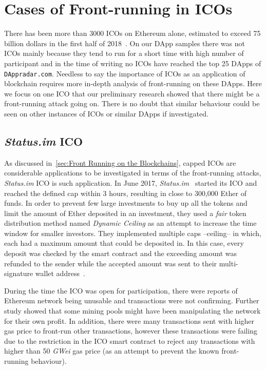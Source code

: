 \section{Cases of Front-running in ICOs}  \label{sec:ICOsfrontrunning}

There has been more than 3000 ICOs on Ethereum alone, estimated to exceed 75 billion dollars in the first half of 2018~\cite{zetzsche2018ico}. On our DApp samples there was not ICOs mainly because they tend to run for a short time with high number of participant and in the time of writing no ICOs have reached the top 25 DApps of \texttt{DAppradar.com}. Needless to say the importance of ICOs as an application of blockchain requires more in-depth analysis of front-running on these DApps. %
Here we focus on one ICO that our preliminary research showed that there might be a front-running attack going on. There is no doubt that similar behaviour could be seen on other instances of ICOs or similar DApps if investigated.

\subsection{\textit{Status.im} ICO}
As discussed in~\ref{sec:Front Running on the Blockchains}, capped ICOs are considerable applications to be investigated in terms of the front-running attacks, \textit{Status.im} ICO is such application. In June 2017, \textit{Status.im}~\cite{statuswhitepaper} started its ICO and reached the defined cap within 3 hours, resulting in close to 300,000 Ether of funds. In order to prevent few large investments to buy up all the tokens and limit the amount of Ether deposited in an investment, they used a \textit{fair} token distribution method named \textit{Dynamic Ceiling} as an attempt to increase the time window for smaller investors. They implemented multiple caps --ceiling-- in which, each had a maximum amount that could be deposited in. In this case, every deposit was checked by the smart contract and the exceeding amount was refunded to the sender while the accepted amount was sent to their multi-signature wallet address~\cite{statusicoanalysis}. 

During the time the ICO was open for participation, there were reports of Ethereum network being unusable and transactions were not confirming. Further study showed that some mining pools might have been manipulating the network for their own profit. In addition, there were many transactions sent with higher gas price to front-run other transactions, however these transactions were failing due to the restriction in the ICO smart contract to reject any transactions with higher than 50 \textit{GWei} gas price (as an attempt to prevent the known front-running behaviour).

